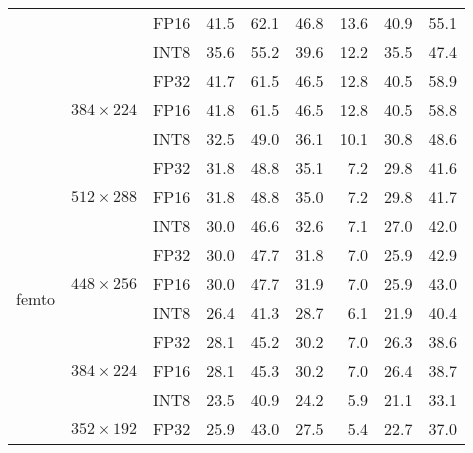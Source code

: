 \begin{appendices}
\begin{table}[t]
\begin{threeparttable}
\begin{tabular}{|c|c|c|rrrrrr|}
                                        &                                  & FP16 & 41.5 & 62.1 & 46.8 & 13.6 & 40.9 & 55.1 \\
                                        &                                  & INT8 & 35.6 & 55.2 & 39.6 & 12.2 & 35.5 & 47.4 \\
            \cline{2-9}
                                        & \multirow{3}{*}{$384\times224$}  & FP32 & 41.7 & 61.5 & 46.5 & 12.8 & 40.5 & 58.9 \\
                                        &                                  & FP16 & 41.8 & 61.5 & 46.5 & 12.8 & 40.5 & 58.8 \\
                                        &                                  & INT8 & 32.5 & 49.0 & 36.1 & 10.1 & 30.8 & 48.6 \\
            \hline
            \multirow{12}{*}{femto}     & \multirow{3}{*}{$512\times288$}  & FP32 & 31.8 & 48.8 & 35.1 &  7.2 & 29.8 & 41.6 \\
                                        &                                  & FP16 & 31.8 & 48.8 & 35.0 &  7.2 & 29.8 & 41.7 \\
                                        &                                  & INT8 & 30.0 & 46.6 & 32.6 &  7.1 & 27.0 & 42.0 \\
            \cline{2-9}
                                        & \multirow{3}{*}{$448\times256$}  & FP32 & 30.0 & 47.7 & 31.8 &  7.0 & 25.9 & 42.9 \\
                                        &                                  & FP16 & 30.0 & 47.7 & 31.9 &  7.0 & 25.9 & 43.0 \\
                                        &                                  & INT8 & 26.4 & 41.3 & 28.7 &  6.1 & 21.9 & 40.4 \\
            \cline{2-9}
                                        & \multirow{3}{*}{$384\times224$}  & FP32 & 28.1 & 45.2 & 30.2 &  7.0 & 26.3 & 38.6 \\
                                        &                                  & FP16 & 28.1 & 45.3 & 30.2 &  7.0 & 26.4 & 38.7 \\
                                        &                                  & INT8 & 23.5 & 40.9 & 24.2 &  5.9 & 21.1 & 33.1 \\
            \cline{2-9}
                                        & \multirow{3}{*}{$352\times192$}  & FP32 & 25.9 & 43.0 & 27.5 &  5.4 & 22.7 & 37.0 \\

\end{tabular}
\end{threeparttable}
\end{table}
\end{appendices}
